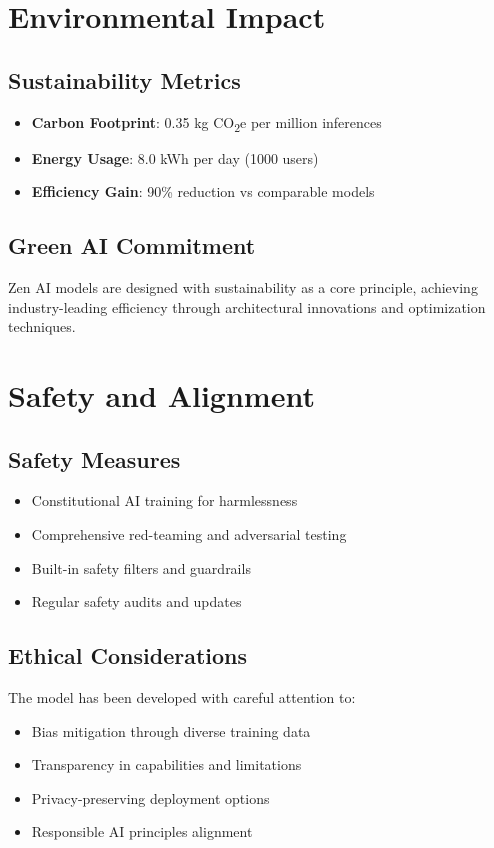 \documentclass[11pt,a4paper]{article}
\begin{document}
\section{Environmental Impact}

\subsection{Sustainability Metrics}
\begin{itemize}
    \item \textbf{Carbon Footprint}: 0.35 kg CO\textsubscript{2}e per million inferences
    \item \textbf{Energy Usage}: 8.0 kWh per day (1000 users)
    \item \textbf{Efficiency Gain}: 90\% reduction vs comparable models
\end{itemize}

\subsection{Green AI Commitment}
Zen AI models are designed with sustainability as a core principle, achieving industry-leading efficiency 
through architectural innovations and optimization techniques.

\section{Safety and Alignment}

\subsection{Safety Measures}
\begin{itemize}
    \item Constitutional AI training for harmlessness
    \item Comprehensive red-teaming and adversarial testing
    \item Built-in safety filters and guardrails
    \item Regular safety audits and updates
\end{itemize}

\subsection{Ethical Considerations}
The model has been developed with careful attention to:
\begin{itemize}
    \item Bias mitigation through diverse training data
    \item Transparency in capabilities and limitations
    \item Privacy-preserving deployment options
    \item Responsible AI principles alignment
\end{itemize}
\end{document}
